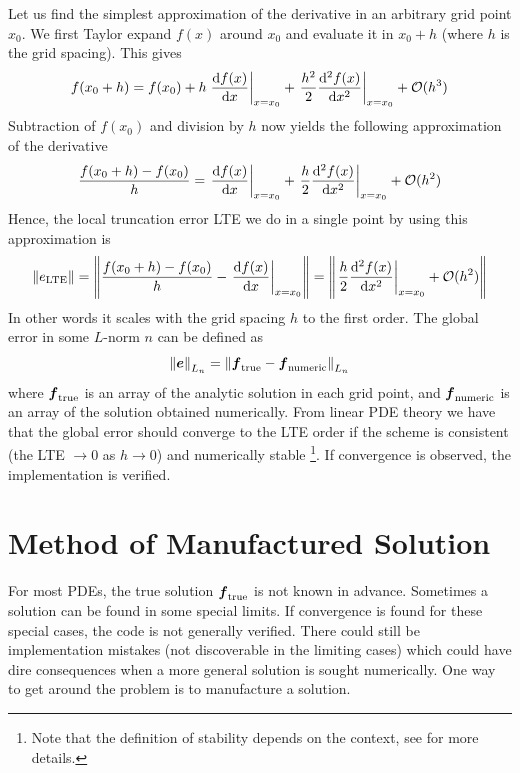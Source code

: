 Let us find the simplest approximation of the derivative in an arbitrary grid point $x_0$.
We first Taylor expand $f(x)$ around $x_0$ and evaluate it in $x_0 + h$ (where $h$ is the grid spacing).
This gives
%
\begin{align*}
    f(x_0+h)
    = f(x_0)
    + h \left.\frac{\text{d}{f(x)}}{\text{d}{x}}\right|_{x=x_0}
    + \left.\frac{h^2}{2}\frac{\text{d}{^2f(x)}}{\text{d}{x^2}}\right|_{x=x_0}
    + \mathcal{O}(h^3)
\end{align*}
%
Subtraction of $f(x_0)$ and division by $h$ now yields the following approximation of the derivative
%
\begin{align*}
    \frac{f(x_0+h) - f(x_0)}{h}
    =  \left.\frac{\text{d}{f(x)}}{\text{d}{x}}\right|_{x=x_0}
    + \left.\frac{h}{2}\frac{\text{d}{^2f(x)}}{\text{d}{x^2}}\right|_{x=x_0}
    + \mathcal{O}(h^2)
\end{align*}
%
Hence, the local truncation error LTE we do in a single point by using this approximation is
%
\begin{align*}
    \|e_{\text{LTE}}\|
    =
    \left\|\frac{f(x_0+h) - f(x_0)}{h} - \left.\frac{\text{d}{f(x)}}{\text{d}{x}}\right|_{x=x_0}\right\|
    =
    \left\| \left.\frac{h}{2}\frac{\text{d}{^2f(x)}}{\text{d}{x^2}}\right|_{x=x_0} + \mathcal{O}(h^2)\right\|
\end{align*}
%
In other words it scales with the grid spacing $h$ to the first order.
The global error in some $L$-norm $n$ can be defined as
%
\begin{align*}
    \left\|\boldsymbol{e}\right\|_{L_n} =
    \left\|\boldsymbol{f}_{\text{true}} - \boldsymbol{f}_{\text{numeric}}\right\|_{L_n}
\end{align*}
%
where $\boldsymbol{f}_{\text{true}}$ is an array of the analytic solution in each grid point, and $\boldsymbol{f}_{\text{numeric}}$ is an array of the solution obtained numerically.
From linear PDE theory we have that the global error should converge to the LTE order if the scheme is consistent (the LTE $\to 0$ as $h\to 0$) and numerically stable%
\footnote{Note that the definition of stability depends on the context, see \cite{Leveque2007book} for more details.}.
%
If convergence is observed, the implementation is verified.

\section{Method of Manufactured Solution}
\label{sec:MMS}
For most PDEs, the true solution $\boldsymbol{f}_{\text{true}}$ is not known in advance.
Sometimes a solution can be found in some special limits.
If convergence is found for these special cases, the code is not generally verified.
There could still be implementation mistakes (not discoverable in the limiting cases) which could have dire consequences when a more general solution is sought numerically.
One way to get around the problem is to manufacture a solution.


